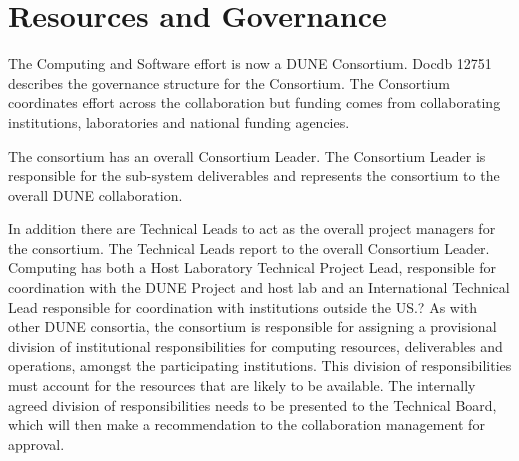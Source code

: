 




\section{Resources and Governance}		
\label{ch:exec-comp-gov}

The Computing and Software effort is now a DUNE Consortium.  Docdb 12751  describes the governance structure for the Consortium.  The Consortium coordinates effort across the collaboration but funding comes from collaborating institutions, laboratories and national funding agencies. 

The consortium has an overall Consortium Leader. The Consortium Leader is responsible for the sub-system deliverables and represents the consortium to the overall DUNE collaboration.

In addition there  are Technical Leads to act as the overall project managers for the consortium. The Technical Leads report to the overall Consortium Leader.
Computing has both a Host Laboratory Technical Project Lead, responsible for coordination with the DUNE Project and host lab and an International Technical Lead responsible for coordination with institutions outside the US.?
As with other DUNE consortia, the consortium is responsible for assigning a provisional division of institutional
responsibilities for computing resources, deliverables and operations, amongst the participating institutions. This division of responsibilities must account for the resources that are likely to be available. The internally agreed division of responsibilities needs to be presented to the Technical Board, which will then make a recommendation to the collaboration management for approval.



